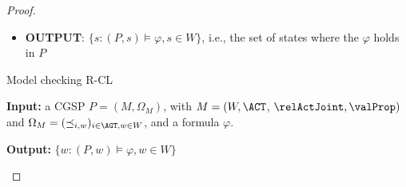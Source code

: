\begin{proof}
\begin{itemize}
    \item 
    \textbf{OUTPUT}:  $\{s: (P,s) \models \varphi, s\in W\}$, i.e., the set of states  where the $\varphi$ holds in $P$
\end{itemize}
\fi
%




\begin{breakablealgorithm}
\label{alg:mc}
	\caption{Model checking R-CL } 
	\begin{algorithmic}[1] 
   \noindent \textbf{Input: }   a CGSP $P = (M,\Omega_M)$, with   $M  = ( W,  \ACT$, $ \relActJoint, \allowbreak  \valProp  )$  and $\Omega_M=(\preceq_{i,w }   )_{i \in \AGT, w \in W }$, and a \atlratlogic formula $\varphi$.
   \par 
   \noindent \textbf{Output: } $\{w: (P,w) \models \varphi, w\in W\}$ %
        \EndCase
    

\end{algorithmic}
\end{breakablealgorithm}
\end{proof}
